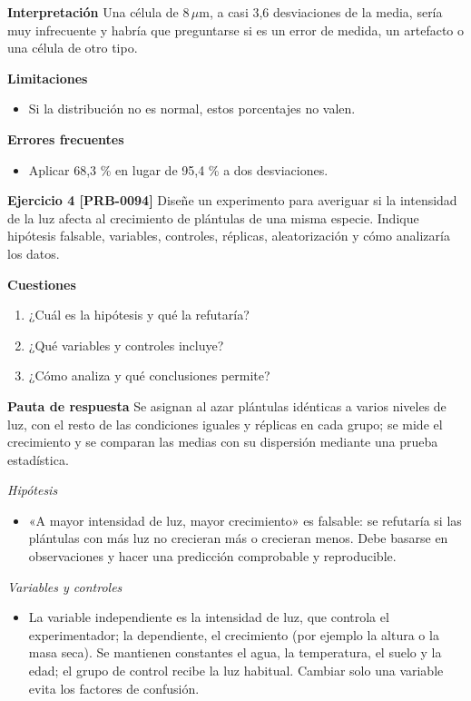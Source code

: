 \documentclass{book}
\begin{document}
\noindent\textbf{Interpretación}
Una célula de \(8\,\mu\mathrm{m}\), a casi 3,6 desviaciones de la media, sería muy infrecuente y habría que preguntarse si es un error de medida, un artefacto o una célula de otro tipo.


\noindent\textbf{Limitaciones}
\begin{itemize}
\item Si la distribución no es normal, estos porcentajes no valen.
\end{itemize}

\noindent\textbf{Errores frecuentes}
\begin{itemize}
\item Aplicar 68,3 \% en lugar de 95,4 \% a dos desviaciones.
\end{itemize}

\noindent\textbf{Ejercicio 4 [PRB-0094]}
Diseñe un experimento para averiguar si la intensidad de la luz afecta al crecimiento de plántulas de una misma especie. Indique hipótesis falsable, variables, controles, réplicas, aleatorización y cómo analizaría los datos.


\noindent\textbf{Cuestiones}
\begin{enumerate}
\item ¿Cuál es la hipótesis y qué la refutaría?
\item ¿Qué variables y controles incluye?
\item ¿Cómo analiza y qué conclusiones permite?
\end{enumerate}

\noindent\textbf{Pauta de respuesta}
Se asignan al azar plántulas idénticas a varios niveles de luz, con el resto de las condiciones iguales y réplicas en cada grupo; se mide el crecimiento y se comparan las medias con su dispersión mediante una prueba estadística.


\noindent\textit{Hipótesis}
\begin{itemize}
\item «A mayor intensidad de luz, mayor crecimiento» es falsable: se refutaría si las plántulas con más luz no crecieran más o crecieran menos. Debe basarse en observaciones y hacer una predicción comprobable y reproducible.
\end{itemize}

\noindent\textit{Variables y controles}
\begin{itemize}
\item La variable independiente es la intensidad de luz, que controla el experimentador; la dependiente, el crecimiento (por ejemplo la altura o la masa seca). Se mantienen constantes el agua, la temperatura, el suelo y la edad; el grupo de control recibe la luz habitual. Cambiar solo una variable evita los factores de confusión.
\end{itemize}
\end{document}
